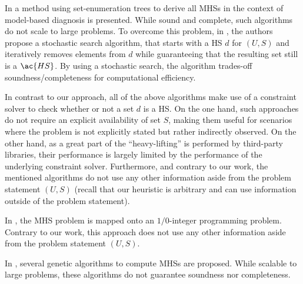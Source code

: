 In \citep{Zhao07} a method using set-enumeration trees to derive all
\acp{MHS} in the context of model-based diagnosis is presented.
%
While sound and complete, such algorithms do not scale to large
problems.
%
To overcome this problem, in \citep{Feldman08}, the authors propose a
stochastic search algorithm, that starts with a \ac{HS} $d$ for
$(U, S)$ and iteratively removes elements from $d$ while guaranteeing
that the resulting set still is a $\ac{HS}$.
%
By using a stochastic search, the algorithm trades-off
soundness/completeness for computational efficiency.

In contrast to our approach, all of the above algorithms make use of a
constraint solver to check whether or not a set $d$ is a \ac{HS}.
%
On the one hand, such approaches do not require an explicit
availability of set $S$, making them useful for scenarios where the
problem is not explicitly stated but rather indirectly observed.
%
On the other hand, as a great part of the ``heavy-lifting'' is
performed by third-party libraries, their performance is largely
limited by the performance of the underlying constraint solver.
%
Furthermore, and contrary to our work, the mentioned algorithms do not
use any other information aside from the problem statement $(U,S)$
(recall that our heuristic is arbitrary and can use information
outside of the problem statement).


In \citep{Fijany04,Fijany05}, the \ac{MHS} problem is mapped onto an
$1/0$-integer programming problem.
%
Contrary to our work, this approach does not use any other information
aside from the problem statement $(U,S)$.

In \citep{Vinterbo00,Li02,Aickelin04,Huang94}, several genetic algorithms
to compute \acp{MHS} are proposed.
%
While scalable to large problems, these algorithms do not guarantee
soundness nor completeness.

